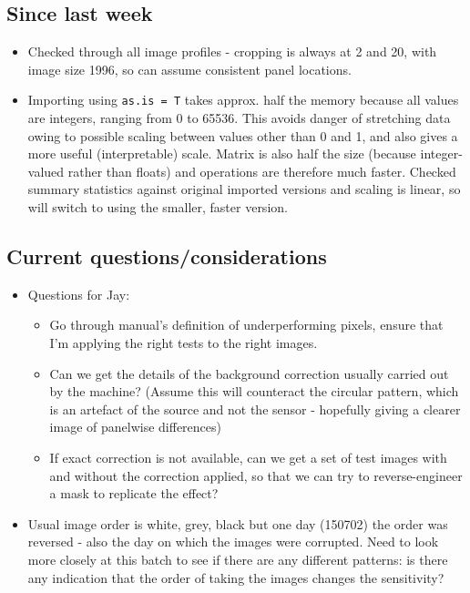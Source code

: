 \documentclass[10pt,fleqn]{article}
\begin{document}
\subsection*{Since last week}

\begin{itemize}

\item
Checked through all image profiles - cropping is always at 2 and 20, with image size 1996, so can assume consistent panel locations.

\item
Importing using \texttt{as.is = T} takes approx. half the memory because all values are integers, ranging from 0 to 65536. This avoids danger of stretching data owing to possible scaling between values other than 0 and 1, and also gives a more useful (interpretable) scale. Matrix is also half the size (because integer-valued rather than floats) and operations are therefore much faster. Checked summary statistics against original imported versions and scaling is linear, so will switch to using the smaller, faster version.
\end{itemize}

\subsection*{Current questions/considerations}

\begin{itemize}
\item
Questions for Jay:
\begin{itemize}

\item
Go through manual's definition of underperforming pixels, ensure that I'm applying the right tests to the right images.

\item
Can we get the details of the background correction usually carried out by the machine? (Assume this will counteract the circular pattern, which is an artefact of the source and not the sensor - hopefully giving a clearer image of panelwise differences)

\item
If exact correction is not available, can we get a set of test images with and without the correction applied, so that we can try to reverse-engineer a mask to replicate the effect?
\end{itemize}

\item
Usual image order is white, grey, black but one day (150702) the order was reversed - also the day on which the images were corrupted. Need to look more closely at this batch to see if there are any different patterns: is there any indication that the order of taking the images changes the sensitivity?
\end{itemize}
\end{document}
